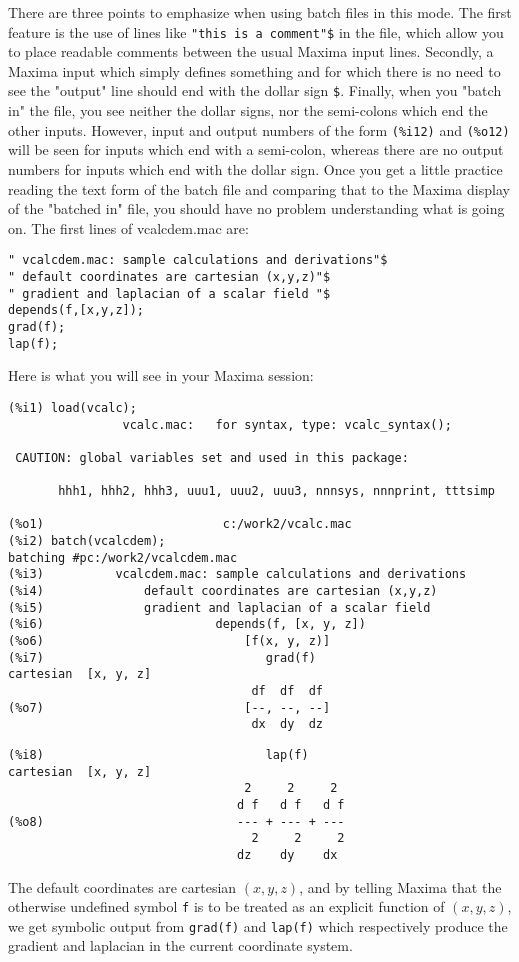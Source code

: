 \documentclass[12pt]{article}
\begin{document}
\smallskip
There are three points to emphasize when using batch files in this mode.
The first feature is the use of lines like \verb|"this is a comment"$| in the file, 
  which allow you to place readable comments between the usual Maxima input
  lines.
Secondly, a Maxima input which simply defines something and for which there
  is no need to see the "output" line should end with the dollar sign \verb|$|.
Finally, when you "batch in" the file, you see neither the dollar signs, nor the semi-colons
  which end the other inputs.
However, input and output numbers of the form \verb|(%i12)| and \verb|(%o12)| will
  be seen for inputs which end with a semi-colon, whereas there are no output 
  numbers for inputs which end with the dollar sign.
Once you get a little practice reading the text form of the batch file and
  comparing that to the Maxima display of the "batched in" file, you should have
  no problem understanding what is going on.  
The first lines of vcalcdem.mac are:
\small
\begin{verbatim}
" vcalcdem.mac: sample calculations and derivations"$
" default coordinates are cartesian (x,y,z)"$
" gradient and laplacian of a scalar field "$
depends(f,[x,y,z]);
grad(f);
lap(f);
\end{verbatim}
\normalsize
Here is what you will see in your Maxima session:
\small
\begin{verbatim}
(%i1) load(vcalc);
                vcalc.mac:   for syntax, type: vcalc_syntax(); 

 CAUTION: global variables set and used in this package:

       hhh1, hhh2, hhh3, uuu1, uuu2, uuu3, nnnsys, nnnprint, tttsimp 

(%o1)                         c:/work2/vcalc.mac
(%i2) batch(vcalcdem);
batching #pc:/work2/vcalcdem.mac
(%i3)          vcalcdem.mac: sample calculations and derivations
(%i4)              default coordinates are cartesian (x,y,z)
(%i5)              gradient and laplacian of a scalar field 
(%i6)                        depends(f, [x, y, z])
(%o6)                            [f(x, y, z)]
(%i7)                               grad(f)
cartesian  [x, y, z] 
                                  df  df  df
(%o7)                            [--, --, --]
                                  dx  dy  dz
\end{verbatim}
\newpage
\begin{verbatim}
(%i8)                               lap(f)
cartesian  [x, y, z] 
                                 2     2     2
                                d f   d f   d f
(%o8)                           --- + --- + ---
                                  2     2     2
                                dz    dy    dx
\end{verbatim}
\normalsize
The default coordinates are cartesian $(x,y,z)$, and by telling Maxima that the
  otherwise undefined symbol \verb|f| is to be treated as an explicit function
  of $(x,y,z)$, we get symbolic output from \verb|grad(f)| and \verb|lap(f)| which
  respectively produce the gradient and laplacian in the current coordinate system.
\end{document}
